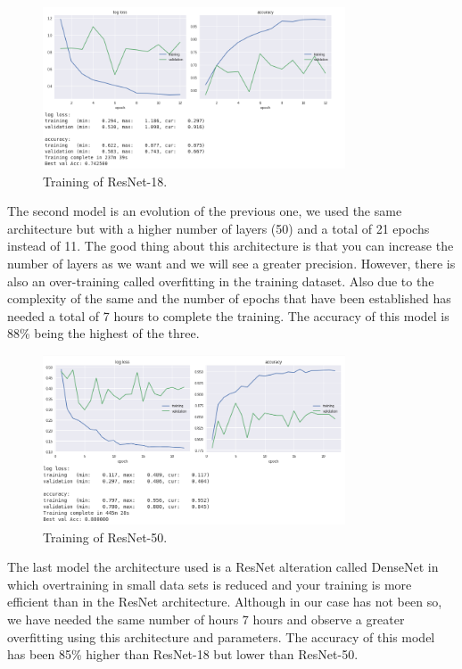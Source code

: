 \begin{figure}[H]
\centering
\includegraphics[width=0.8\textwidth]{./figures/resnet-18}
\caption{Training of ResNet-18.}
\end{figure}


The second model is an evolution of the previous one, we used the same architecture but with a higher number of layers (50) and a total of 21 epochs instead of 11. The good thing about this architecture is that you can increase the number of layers as we want and we will see a greater precision. However, there is also an over-training called overfitting in the training dataset. Also due to the complexity of the same and the number of epochs that have been established has needed a total of 7 hours to complete the training. The accuracy of this model is 88\% being the highest of the three.


\begin{figure}[H]
\centering
\includegraphics[width=0.8\textwidth]{./figures/resnet-50}
\caption{Training of ResNet-50.}
\end{figure}

The last model the architecture used is a ResNet alteration called DenseNet in which overtraining in small data sets is reduced and your training is more efficient than in the ResNet architecture. Although in our case has not been so, we have needed the same number of hours 7 hours and observe a greater overfitting using this architecture and parameters. The accuracy of this model has been 85\% higher than ResNet-18 but lower than ResNet-50.


